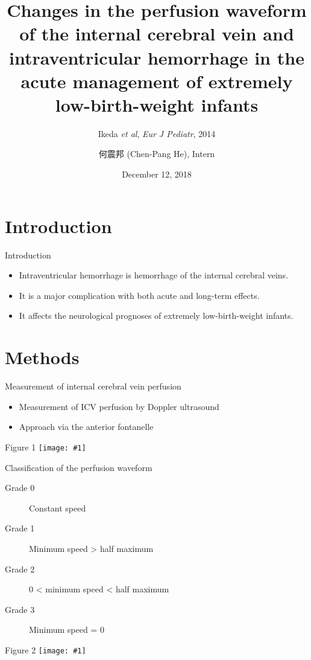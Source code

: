 \documentclass{beamer}
\title[(Ikeda \textit{et al}, 2018)]{
    Changes in the perfusion waveform of the internal cerebral vein and
    intraventricular hemorrhage in the acute management of extremely
    low-birth-weight infants
}
\subtitle{Ikeda \textit{et al}, \textit{Eur J Pediatr}, 2014}
\author[Chen-Pang He]{何震邦 (Chen-Pang He), Intern}
\date{December 12, 2018}
\institute[CGH]{Cathay General Hospital}
\newcommand*{\solo}[1]{\centering\texttt{[image: \#1]}}
\begin{document}
\maketitle

\section{Introduction}
\begin{frame}{Introduction}
    \begin{itemize}
        \item Intraventricular hemorrhage is hemorrhage of the internal cerebral veins.
        \item It is a major complication with both acute and long-term effects.
        \item It affects the neurological prognoses of extremely low-birth-weight infants.
    \end{itemize}
\end{frame}

\section{Methods}
\begin{frame}{Measurement of internal cerebral vein perfusion}
    \begin{itemize}
        \item Measurement of ICV perfusion by Doppler ultrasound
        \item Approach via the anterior fontanelle
    \end{itemize}
\end{frame}

\begin{frame}{Figure 1}
    \solo{F1.png}
\end{frame}

\begin{frame}{Classification of the perfusion waveform}
    \begin{description}
        \item[Grade 0] Constant speed
        \item[Grade 1] Minimum speed > half maximum
        \item[Grade 2] 0 < minimum speed < half maximum
        \item[Grade 3] Minimum speed = 0
    \end{description}
\end{frame}

\begin{frame}{Figure 2}
    \solo{F2.png}
\end{frame}
\end{document}

